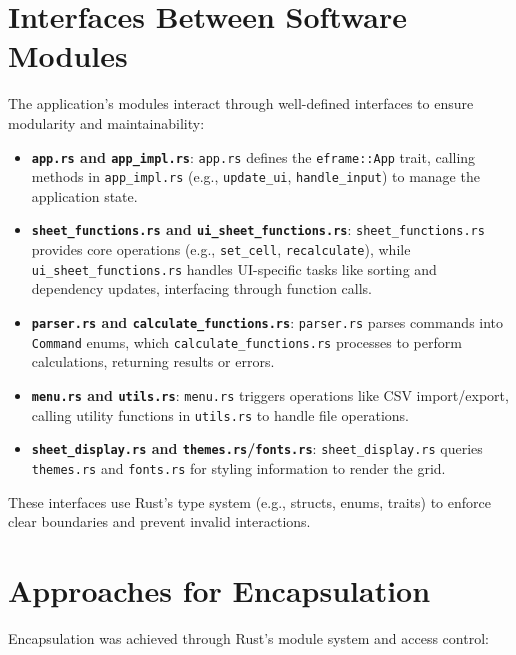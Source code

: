 \documentclass{article}
\begin{document}
\section{Interfaces Between Software Modules}
The application’s modules interact through well-defined interfaces to ensure modularity and maintainability:

\begin{itemize}
    \item \textbf{\texttt{app.rs} and \texttt{app\_impl.rs}}: \texttt{app.rs} defines the \texttt{eframe::App} trait, calling methods in \texttt{app\_impl.rs} (e.g., \texttt{update\_ui}, \texttt{handle\_input}) to manage the application state.
    \item \textbf{\texttt{sheet\_functions.rs} and \texttt{ui\_sheet\_functions.rs}}: \texttt{sheet\_functions.rs} provides core operations (e.g., \texttt{set\_cell}, \texttt{recalculate}), while \texttt{ui\_sheet\_functions.rs} handles UI-specific tasks like sorting and dependency updates, interfacing through function calls.
    \item \textbf{\texttt{parser.rs} and \texttt{calculate\_functions.rs}}: \texttt{parser.rs} parses commands into \texttt{Command} enums, which \texttt{calculate\_functions.rs} processes to perform calculations, returning results or errors.
    \item \textbf{\texttt{menu.rs} and \texttt{utils.rs}}: \texttt{menu.rs} triggers operations like CSV import/export, calling utility functions in \texttt{utils.rs} to handle file operations.
    \item \textbf{\texttt{sheet\_display.rs} and \texttt{themes.rs}/\texttt{fonts.rs}}: \texttt{sheet\_display.rs} queries \texttt{themes.rs} and \texttt{fonts.rs} for styling information to render the grid.
\end{itemize}

These interfaces use Rust’s type system (e.g., structs, enums, traits) to enforce clear boundaries and prevent invalid interactions.

\section{Approaches for Encapsulation}
Encapsulation was achieved through Rust’s module system and access control:
\end{document}

